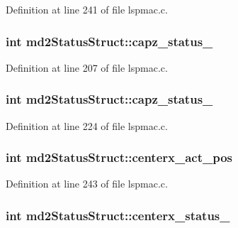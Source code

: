 Definition at line 241 of file lspmac.c.\hypertarget{structmd2StatusStruct_a719db4477f35331eaa8b7b44150e88a2}{
\subsubsection[{capz\_\-status\_\-1}]{\setlength{\rightskip}{0pt plus 5cm}int {\bf md2StatusStruct::capz\_\-status\_}}}
\label{structmd2StatusStruct_a719db4477f35331eaa8b7b44150e88a2}


Definition at line 207 of file lspmac.c.\hypertarget{structmd2StatusStruct_a3abb998bb89433aed16121d0dae6275a}{
\subsubsection[{capz\_\-status\_\-2}]{\setlength{\rightskip}{0pt plus 5cm}int {\bf md2StatusStruct::capz\_\-status\_}}}
\label{structmd2StatusStruct_a3abb998bb89433aed16121d0dae6275a}


Definition at line 224 of file lspmac.c.\hypertarget{structmd2StatusStruct_ae7924b6e91e1de82f6f7910cb3a9c9bd}{
\subsubsection[{centerx\_\-act\_\-pos}]{\setlength{\rightskip}{0pt plus 5cm}int {\bf md2StatusStruct::centerx\_\-act\_\-pos}}}
\label{structmd2StatusStruct_ae7924b6e91e1de82f6f7910cb3a9c9bd}


Definition at line 243 of file lspmac.c.\hypertarget{structmd2StatusStruct_aa619cdbd7a563408c6b825ddc4f74ebb}{
\subsubsection[{centerx\_\-status\_\-1}]{\setlength{\rightskip}{0pt plus 5cm}int {\bf md2StatusStruct::centerx\_\-status\_}}}
\label{structmd2StatusStruct_aa619cdbd7a563408c6b825ddc4f74ebb}


